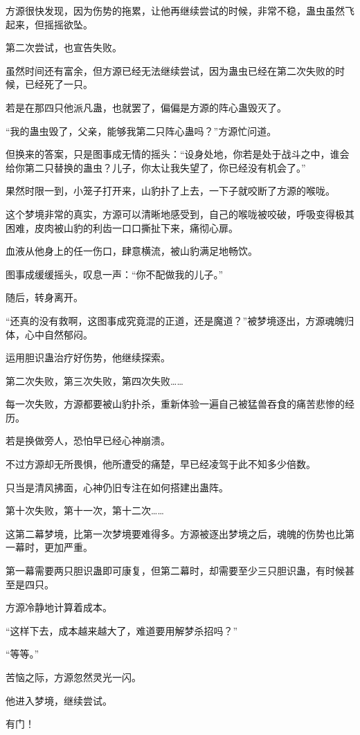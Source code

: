 \begin{this_body}
方源很快发现，因为伤势的拖累，让他再继续尝试的时候，非常不稳，蛊虫虽然飞起来，但摇摇欲坠。

第二次尝试，也宣告失败。

虽然时间还有富余，但方源已经无法继续尝试，因为蛊虫已经在第二次失败的时候，已经死了一只。

若是在那四只他派凡蛊，也就罢了，偏偏是方源的阵心蛊毁灭了。

“我的蛊虫毁了，父亲，能够我第二只阵心蛊吗？”方源忙问道。

但换来的答案，只是图事成无情的摇头：“设身处地，你若是处于战斗之中，谁会给你第二只替换的蛊虫？儿子，你太让我失望了，你已经没有机会了。”

果然时限一到，小笼子打开来，山豹扑了上去，一下子就咬断了方源的喉咙。

这个梦境非常的真实，方源可以清晰地感受到，自己的喉咙被咬破，呼吸变得极其困难，皮肉被山豹的利齿一口口撕扯下来，痛彻心扉。

血液从他身上的任一伤口，肆意横流，被山豹满足地畅饮。

图事成缓缓摇头，叹息一声：“你不配做我的儿子。”

随后，转身离开。

“还真的没有救啊，这图事成究竟混的正道，还是魔道？”被梦境逐出，方源魂魄归体，心中自然郁闷。

运用胆识蛊治疗好伤势，他继续探索。

第二次失败，第三次失败，第四次失败……

每一次失败，方源都要被山豹扑杀，重新体验一遍自己被猛兽吞食的痛苦悲惨的经历。

若是换做旁人，恐怕早已经心神崩溃。

不过方源却无所畏惧，他所遭受的痛楚，早已经凌驾于此不知多少倍数。

只当是清风拂面，心神仍旧专注在如何搭建出蛊阵。

第十次失败，第十一次，第十二次……

这第二幕梦境，比第一次梦境要难得多。方源被逐出梦境之后，魂魄的伤势也比第一幕时，更加严重。

第一幕需要两只胆识蛊即可康复，但第二幕时，却需要至少三只胆识蛊，有时候甚至是四只。

方源冷静地计算着成本。

“这样下去，成本越来越大了，难道要用解梦杀招吗？”

“等等。”

苦恼之际，方源忽然灵光一闪。

他进入梦境，继续尝试。

有门！

\end{this_body}

